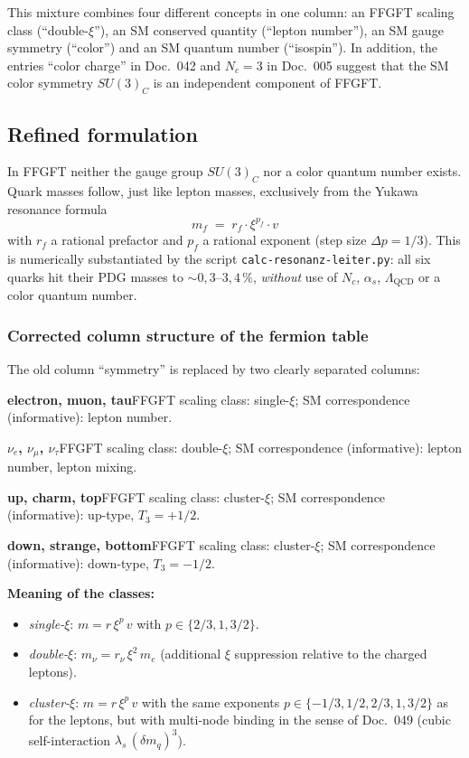 This mixture combines four different concepts in one column: an FFGFT scaling
class (\enquote{double-$\xi$}), an SM conserved quantity (\enquote{lepton
number}), an SM gauge symmetry (\enquote{color}) and an SM quantum number
(\enquote{isospin}). In addition, the entries \enquote{color charge} in
Doc.~042 and $N_c = 3$ in Doc.~005 suggest that the SM color symmetry
$SU(3)_C$ is an independent component of FFGFT.

\subsection*{Refined formulation}

In FFGFT neither the gauge group $SU(3)_C$ nor a color quantum number exists.
Quark masses follow, just like lepton masses, exclusively from the Yukawa
resonance formula
\begin{equation}
  m_f \;=\; r_f \cdot \xi^{p_f} \cdot v
  \tag{190.13}
\end{equation}
with $r_f$ a rational prefactor and $p_f$ a rational exponent (step size
$\Delta p = 1/3$). This is numerically substantiated by the script
\texttt{calc-resonanz-leiter.py}: all six quarks hit their PDG masses to
$\sim 0{,}3\text{--}3{,}4\,\%$, \emph{without} use of $N_c$, $\alpha_s$,
$\Lambda_{\text{QCD}}$ or a color quantum number.

\subsubsection*{Corrected column structure of the fermion table}

The old column \enquote{symmetry} is replaced by two clearly separated columns:

\smallskip\noindent \textbf{electron, muon, tau}\quad FFGFT scaling class: single-$\xi$; SM correspondence (informative): lepton number.

\smallskip\noindent \textbf{$\nu_e$, $\nu_\mu$, $\nu_\tau$}\quad FFGFT scaling class: double-$\xi$; SM correspondence (informative): lepton number, lepton mixing.

\smallskip\noindent \textbf{up, charm, top}\quad FFGFT scaling class: cluster-$\xi$; SM correspondence (informative): up-type, $T_3 = +1/2$.

\smallskip\noindent \textbf{down, strange, bottom}\quad FFGFT scaling class: cluster-$\xi$; SM correspondence (informative): down-type, $T_3 = -1/2$.

\medskip


\textbf{Meaning of the classes:}
\begin{itemize}
  \item \emph{single-$\xi$}: $m = r\,\xi^p\,v$ with $p \in \{2/3, 1, 3/2\}$.
  \item \emph{double-$\xi$}: $m_\nu = r_\nu\,\xi^2\,m_e$
        (additional $\xi$ suppression relative to the charged leptons).
  \item \emph{cluster-$\xi$}: $m = r\,\xi^p\,v$ with the same exponents
        $p \in \{-1/3, 1/2, 2/3, 1, 3/2\}$ as for the leptons, but with
        multi-node binding in the sense of Doc.~049 (cubic self-interaction
        $\lambda_s\,(\delta m_q)^3$).
\end{itemize}

